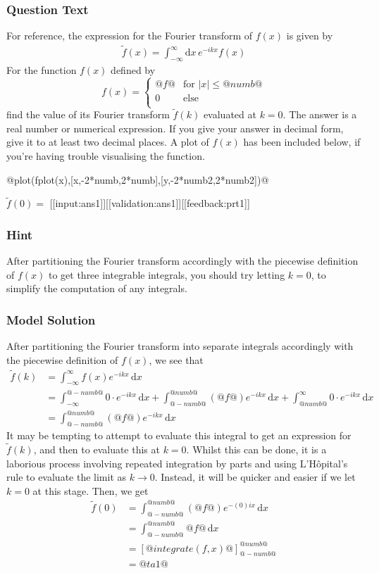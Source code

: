 \documentclass[a4paper,10pt]{article}
\begin{document}
\subsubsection{Question Text}
For reference, the expression for the Fourier transform of $f(x)$ is given by \begin{align*}
\tilde{f}(x) = \int_{-\infty}^{\infty} \text{d}x \, e^{-ikx}f(x)
\end{align*}For the function \(f(x)\) defined by \[ f(x) = \begin{cases} @f@ & \text{for } |x| \leq @numb@\\ 0 & \text{else} \\ \end{cases} \] find the value of its Fourier transform \(\tilde{f}(k)\) evaluated at \(k=0\). The answer is a real number or numerical expression. If you give your answer in decimal form, give it to at least two decimal places. A plot of \(f(x)\) has been included below, if you're having trouble visualising the function.

@plot(fplot(x),[x,-2*numb,2*numb],[y,-2*numb2,2*numb2])@

\(\tilde{f}(0) = \) [[input:ans1]][[validation:ans1]][[feedback:prt1]]
\subsubsection{Hint}
After partitioning the Fourier transform accordingly with the piecewise definition of $f(x)$ to get three integrable integrals, you should try letting \(k=0\), to simplify the computation of any integrals.
\subsubsection{Model Solution}
After partitioning the Fourier transform into separate integrals accordingly with the piecewise definition of $f(x)$, we see that \begin{align*} \tilde{f}(k) &= \int_{-\infty}^{\infty} f(x)e^{-ikx} \, \text{d}x \\ &= \int_{-\infty}^{@-numb@} 0 \cdot e^{-ikx} \, \text{d}x + \int_{@-numb@}^{@numb@} \left(@f@\right)e^{-ikx} \, \text{d}x + \int_{@numb@}^{\infty} 0 \cdot e^{-ikx} \, \text{d}x \\ &= \int_{@-numb@}^{@numb@} \left(@f@\right)e^{-ikx} \, \text{d}x \end{align*} It may be tempting to attempt to evaluate this integral to get an expression for \(\tilde{f}(k)\), and then to evaluate this at \(k=0\). Whilst this can be done, it is a laborious process involving repeated integration by parts and using L'Hôpital's rule to evaluate the limit as $k \rightarrow 0$. Instead, it will be quicker and easier if we let \(k=0\) at this stage. Then, we get \begin{align*} \tilde{f}(0) &= \int_{@-numb@}^{@numb@} \left(@f@\right)e^{-(0)ix} \, \text{d}x \\ &= \int_{@-numb@}^{@numb@} @f@ \, \text{d}x \\ &= \left[ @integrate(f,x)@ \right]_{@-numb@}^{@numb@} \\ &= @ta1@ \end{align*}
\end{document}

